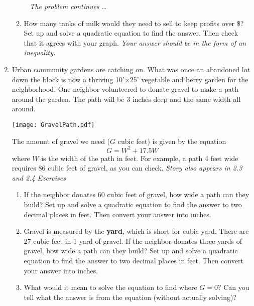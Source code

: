 \begin{enumerate}
\begin{enumerate}
\newpage %
~\hspace{-.5in} \emph{The problem continues \ldots}

\item How many tanks of milk would they need to sell to keep profits over \$?  Set up and solve a quadratic equation to find the answer.  Then check that it agrees with your graph.   \emph{Your answer should be in the form of an inequality.} \vfill
\end{enumerate}

\newpage %

 \item Urban community gardens are catching on.  What was once an abandoned lot down the block is now a thriving 10'$\times$25' vegetable and berry garden for the neighborhood. One neighbor  volunteered to donate  gravel to make a path around the garden.  The path will be 3 inches deep and the same width all around.   
\begin{center}
\scalebox {.4} {\texttt{[image: GravelPath.pdf]}}
\end{center}
The amount of gravel we need ($G$ cubic feet) is given by the equation  $$G = W^2 + 17.5W$$
where $W$ is the width of the path in feet.  For example, a path 4 feet wide requires 86 cubic feet of gravel, as you can check.
\hfill \emph{Story also appears in 2.3 and 2.4 Exercises}
\begin{enumerate}
\item  If the neighbor donates 60 cubic feet of gravel, how wide a path can they build?  Set up and solve a quadratic equation to find the answer to two decimal places in feet. Then convert your answer into inches. \vfill
\item Gravel is measured by the \textbf{yard}, which is short for cubic yard.  There are 27 cubic feet in 1 yard of gravel.  If the neighbor donates three yards of gravel, how wide a path can they build? Set up and solve a quadratic equation to find the answer to two decimal places in feet. Then convert your answer into inches. \vfill
\item What would it mean to solve the equation to find where $G=0$?  Can you tell what the answer is from the equation (without actually solving)? \bigskip
\end{enumerate}

\end{enumerate}




